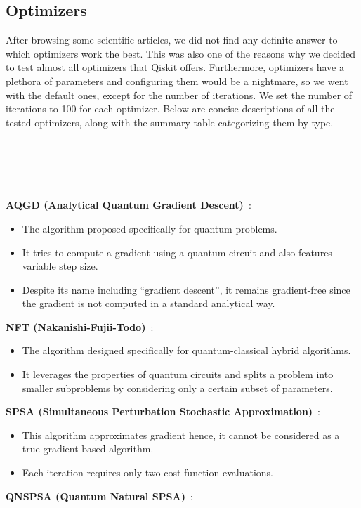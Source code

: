 \tocless\subsection{Optimizers}\noindent
After browsing some scientific articles, we did not find any definite answer to which optimizers work the best. This was also one of the reasons why we decided to test almost all optimizers that Qiskit offers. Furthermore, optimizers have a plethora of parameters and configuring them would be a nightmare, so we went with the default ones, except for the number of iterations. We set the number of iterations to 100 for each optimizer. Below are concise descriptions of all the tested optimizers, along with the summary table categorizing them by type.\\\\\\\\\\\\
\textbf{AQGD (Analytical Quantum Gradient Descent)}~\cite{aqgd}:
\begin{itemize}
    \item The algorithm proposed specifically for quantum problems.
    \item It tries to compute a gradient using a quantum circuit and also features variable step size.
    \item Despite its name including ``gradient descent'', it remains gradient-free since the gradient is not computed in a standard analytical way.
\end{itemize}
\textbf{NFT (Nakanishi-Fujii-Todo)}~\cite{nft}:
\begin{itemize}
    \item The algorithm designed specifically for quantum-classical hybrid algorithms.
    \item It leverages the properties of quantum circuits and splits a problem into smaller subproblems by considering only a certain subset of parameters.
\end{itemize}
\textbf{SPSA (Simultaneous Perturbation Stochastic Approximation)}~\cite{spsa}:
\begin{itemize}
    \item This algorithm approximates gradient hence, it cannot be considered as a true gradient-based algorithm.
    \item Each iteration requires only two cost function evaluations.
\end{itemize}
\textbf{QNSPSA (Quantum Natural SPSA)}~\cite{qnspsa}:
